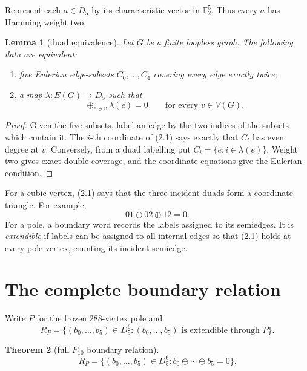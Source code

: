 \documentclass[11pt]{article}
\newtheorem{theorem}{Theorem}[section]
\newtheorem{lemma}[theorem]{Lemma}
\theoremstyle{definition}
\theoremstyle{remark}
\newcommand{\Dfive}{D_5}
\newcommand{\xor}{\mathbin{\oplus}}
\numberwithin{equation}{section}
\begin{document}
Represent each \(a\in\Dfive\) by its characteristic vector in
\(\mathbb F_2^5\).  Thus every \(a\) has Hamming weight two.

\begin{lemma}[duad equivalence]
\label{lem:duad}
Let \(G\) be a finite loopless graph.  The following data are equivalent:
\begin{enumerate}
\item five Eulerian edge-subsets \(C_0,\ldots,C_4\) covering every edge
      exactly twice;
\item a map \(\lambda:E(G)\to\Dfive\) such that
      \[
          \mathop{\xor}_{e\ni v}\lambda(e)=0
          \qquad\text{for every }v\in V(G).
          \tag{2.1}
      \]
\end{enumerate}
\end{lemma}

\begin{proof}
Given the five subsets, label an edge by the two indices of the subsets
which contain it.  The \(i\)-th coordinate of (2.1) says exactly that
\(C_i\) has even degree at \(v\).  Conversely, from a duad labelling put
\(C_i=\{e:i\in\lambda(e)\}\).  Weight two gives exact double coverage,
and the coordinate equations give the Eulerian condition.
\end{proof}

For a cubic vertex, (2.1) says that the three incident duads form a
coordinate triangle.  For example,
\[
                 01\xor 02\xor 12=0.             \tag{2.2}
\]
For a pole, a boundary word records the labels assigned to its semiedges.
It is \emph{extendible} if labels can be assigned to all internal edges so
that (2.1) holds at every pole vertex, counting its incident semiedge.

\section{The complete boundary relation}

Write \(P\) for the frozen 288-vertex pole and
\[
 R_P=\{(b_0,\ldots,b_5)\in\Dfive^6:
              (b_0,\ldots,b_5)\text{ is extendible through }P\}.
\]

\begin{theorem}[full \(F_{10}\) boundary relation]
\label{thm:boundary}
\[
 R_P=\{(b_0,\ldots,b_5)\in\Dfive^6:
                 b_0\xor\cdots\xor b_5=0\}.       \tag{3.1}
\]
\end{theorem}
\end{document}
